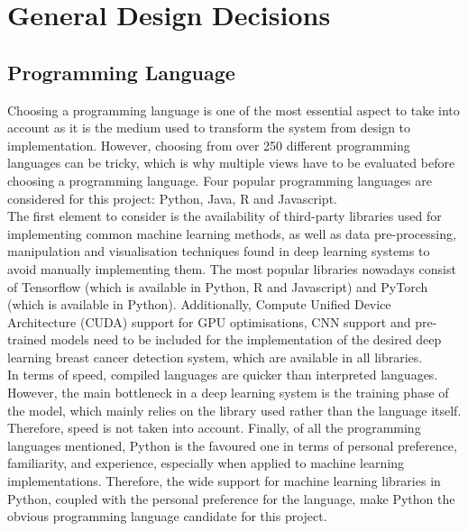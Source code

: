 
\section{General Design Decisions}

\subsection{Programming Language}

Choosing a programming language is one of the most essential aspect to take into account as it is the medium used to transform the system from design to implementation. However, choosing from over 250 different programming languages \cite{tiobe} can be tricky, which is why multiple views have to be evaluated before choosing a programming language. Four popular programming languages are considered for this project: Python, Java, R and  Javascript.\\

The first element to consider is the availability of third-party libraries used for implementing common machine learning methods, as well as data pre-processing, manipulation and visualisation techniques found in deep learning systems to avoid manually implementing them. The most popular libraries nowadays consist of Tensorflow (which is available in Python, R and Javascript) and PyTorch (which is available in Python). Additionally, Compute Unified Device Architecture (CUDA) support for GPU optimisations, CNN support and pre-trained models need to be included for the implementation of the desired deep learning breast cancer detection system, which are available in all libraries.\\

In terms of speed, compiled languages are quicker than interpreted languages. However, the main bottleneck in a deep learning system is the training phase of the model, which mainly relies on the library used rather than the language itself. Therefore, speed is not taken into account. Finally, of all the programming languages mentioned, Python is the favoured one in terms of personal preference, familiarity, and experience, especially when applied to machine learning implementations. Therefore, the wide support for machine learning libraries in Python, coupled with the personal preference for the language, make Python the obvious programming language candidate for this project.\\

